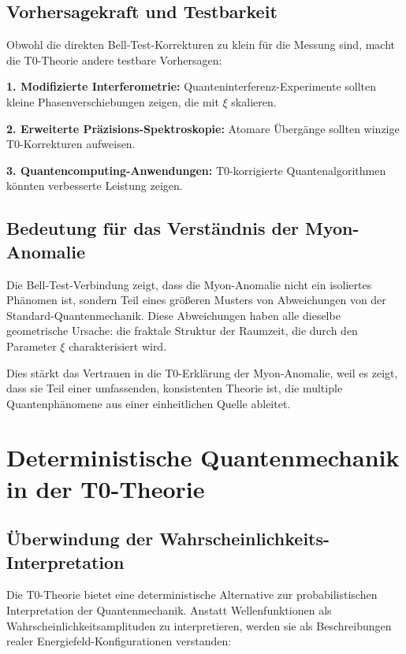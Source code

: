 \documentclass[12pt,a4paper]{article}
\begin{document}
		\subsection{Vorhersagekraft und Testbarkeit}
		
		Obwohl die direkten Bell-Test-Korrekturen zu klein f\"ur die Messung sind, macht die T0-Theorie andere testbare Vorhersagen:
		
		\textbf{1. Modifizierte Interferometrie:}
		Quanteninterferenz-Experimente sollten kleine Phasenverschiebungen zeigen, die mit $\xi$ skalieren.
		
		\textbf{2. Erweiterte Pr\"azisions-Spektroskopie:}
		Atomare \"Uberg\"ange sollten winzige T0-Korrekturen aufweisen.
		
		\textbf{3. Quantencomputing-Anwendungen:}
		T0-korrigierte Quantenalgorithmen k\"onnten verbesserte Leistung zeigen.
		
		\subsection{Bedeutung f\"ur das Verst\"andnis der Myon-Anomalie}
		
		Die Bell-Test-Verbindung zeigt, dass die Myon-Anomalie nicht ein isoliertes Ph\"anomen ist, sondern Teil eines gr\"o\ss{}eren Musters von Abweichungen von der Standard-Quantenmechanik. Diese Abweichungen haben alle dieselbe geometrische Ursache: die fraktale Struktur der Raumzeit, die durch den Parameter $\xi$ charakterisiert wird.
		
		Dies st\"arkt das Vertrauen in die T0-Erkl\"arung der Myon-Anomalie, weil es zeigt, dass sie Teil einer umfassenden, konsistenten Theorie ist, die multiple Quantenph\"anomene aus einer einheitlichen Quelle ableitet.
	
	
	\section{Deterministische Quantenmechanik in der T0-Theorie}
	
	
		\subsection{\"Uberwindung der Wahrscheinlichkeits-Interpretation}
		
		Die T0-Theorie bietet eine deterministische Alternative zur probabilistischen Interpretation der Quantenmechanik. Anstatt Wellenfunktionen als Wahrscheinlichkeitsamplituden zu interpretieren, werden sie als Beschreibungen realer Energiefeld-Konfigurationen verstanden:
		
\end{document}
